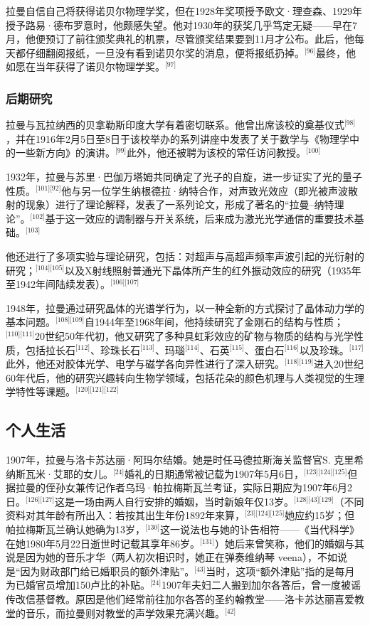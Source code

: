 拉曼自信自己将获得诺贝尔物理学奖，但在1928年奖项授予欧文·理查森、1929年授予路易·德布罗意时，他颇感失望。他对1930年的获奖几乎笃定无疑——早在7月，他便预订了前往颁奖典礼的机票，尽管颁奖结果要到11月才公布。此后，他每天都仔细翻阅报纸，一旦没有看到诺贝尔奖的消息，便将报纸扔掉。\(^\text{[96]}\)最终，他如愿在当年获得了诺贝尔物理学奖。\(^\text{[97]}\)
\subsubsection{后期研究}
拉曼与瓦拉纳西的贝拿勒斯印度大学有着密切联系。他曾出席该校的奠基仪式\(^\text{[98]}\)，并在1916年2月5日至8日于该校举办的系列讲座中发表了关于数学与《物理学中的一些新方向》的演讲。\(^\text{[99]}\)此外，他还被聘为该校的常任访问教授。\(^\text{[100]}\)

1932年，拉曼与苏里·巴伽万塔姆共同确定了光子的自旋，进一步证实了光的量子性质。\(^\text{[101][92]}\)他与另一位学生纳根德拉·纳特合作，对声致光效应（即光被声波散射的现象）进行了理论解释，发表了一系列论文，形成了著名的“拉曼–纳特理论”。\(^\text{[102]}\)基于这一效应的调制器与开关系统，后来成为激光光学通信的重要技术基础。\(^\text{[103]}\)

他还进行了多项实验与理论研究，包括：对超声与高超声频率声波引起的光衍射的研究；\(^\text{[104][105]}\)以及X射线照射普通光下晶体所产生的红外振动效应的研究（1935年至1942年间陆续发表）。\(^\text{[106][107]}\)

1948年，拉曼通过研究晶体的光谱学行为，以一种全新的方式探讨了晶体动力学的基本问题。\(^\text{[108][109]}\)自1944年至1968年间，他持续研究了金刚石的结构与性质；\(^\text{[110][111]}\)20世纪50年代初，他又研究了多种具虹彩效应的矿物与物质的结构与光学性质，包括拉长石\(^\text{[112]}\)、珍珠长石\(^\text{[113]}\)、玛瑙\(^\text{[114]}\)、石英\(^\text{[115]}\)、蛋白石\(^\text{[116]}\)以及珍珠。\(^\text{[117]}\)此外，他还对胶体光学、电学与磁学各向异性进行了深入研究。\(^\text{[118][119]}\)进入20世纪60年代后，他的研究兴趣转向生物学领域，包括花朵的颜色机理与人类视觉的生理学特性等课题。\(^\text{[120][121][122]}\)
\subsection{个人生活}
1907年，拉曼与洛卡苏达丽·阿玛尔结婚。她是时任马德拉斯海关监督官S. 克里希纳斯瓦米·艾耶的女儿。\(^\text{[24]}\)婚礼的日期通常被记载为1907年5月6日，\(^\text{[123][124][125]}\)但据拉曼的侄孙女兼传记作者乌玛·帕拉梅斯瓦兰考证，实际日期应为1907年6月2日。\(^\text{[126][127]}\)这是一场由两人自行安排的婚姻，当时新娘年仅13岁。\(^\text{[128][43][129]}\)（不同资料对其年龄有所出入：若按其出生年份1892年来算，\(^\text{[23][124][125]}\)她应约15岁；但帕拉梅斯瓦兰确认她确为13岁，\(^\text{[130]}\)这一说法也与她的讣告相符——《当代科学》在她1980年5月22日逝世时记载其享年86岁。\(^\text{[131]}\)）她后来曾笑称，他们的婚姻与其说是因为她的音乐才华（两人初次相识时，她正在弹奏维纳琴 veena），不如说是“因为财政部门给已婚职员的额外津贴”。\(^\text{[43]}\)当时，这项“额外津贴”指的是每月为已婚官员增加150卢比的补贴。\(^\text{[24]}\)1907年夫妇二人搬到加尔各答后，曾一度被谣传改信基督教。原因是他们经常前往加尔各答的圣约翰教堂——洛卡苏达丽喜爱教堂的音乐，而拉曼则对教堂的声学效果充满兴趣。\(^\text{[42]}\)

